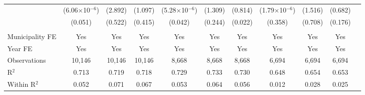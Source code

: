 \documentclass{article}
\begin{document}
\begin{table}[htbp]
\begin{adjustbox}{width=\textwidth}
\begin{tabular}{lcccccccccc}
& (6.06$\times$10$^{-6}$) & (2.892) & (1.097) & (5.28$\times$10$^{-6}$) & (1.309) & (0.814) & (1.79$\times$10$^{-6}$) & (1.516) & (0.682) \\
& (0.051) & (0.522) & (0.415) & (0.042) & (0.244) & (0.022) & (0.358) & (0.708) & (0.176) \\\\
\midrule
Municipality FE & Yes & Yes & Yes & Yes & Yes & Yes & Yes & Yes & Yes \\
Year FE & Yes & Yes & Yes & Yes & Yes & Yes & Yes & Yes & Yes \\
\midrule
Observations & 10,146 & 10,146 & 10,146 & 8,668 & 8,668 & 8,668 & 6,694 & 6,694 & 6,694 \\
R$^2$ & 0.713 & 0.719 & 0.718 & 0.729 & 0.733 & 0.730 & 0.648 & 0.654 & 0.653 \\
Within R$^2$ & 0.052 & 0.071 & 0.067 & 0.053 & 0.064 & 0.056 & 0.012 & 0.028 & 0.025 \\
\bottomrule
\end{tabular}
\end{adjustbox}
\end{table}
\end{document}
